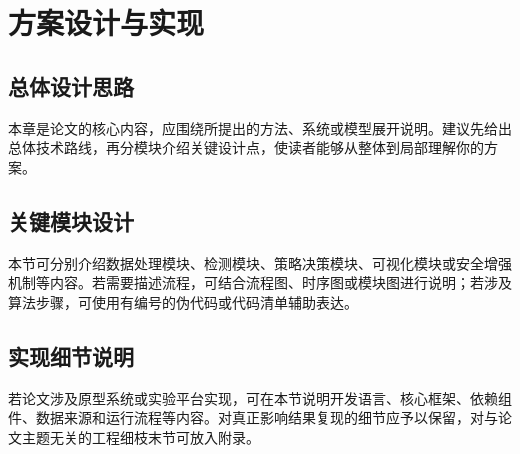 \section{方案设计与实现}

\subsection{总体设计思路}

本章是论文的核心内容，应围绕所提出的方法、系统或模型展开说明。建议先给出总体技术路线，再分模块介绍关键设计点，使读者能够从整体到局部理解你的方案。

\subsection{关键模块设计}

本节可分别介绍数据处理模块、检测模块、策略决策模块、可视化模块或安全增强机制等内容。若需要描述流程，可结合流程图、时序图或模块图进行说明；若涉及算法步骤，可使用有编号的伪代码或代码清单辅助表达。

\subsection{实现细节说明}

若论文涉及原型系统或实验平台实现，可在本节说明开发语言、核心框架、依赖组件、数据来源和运行流程等内容。对真正影响结果复现的细节应予以保留，对与论文主题无关的工程细枝末节可放入附录。
